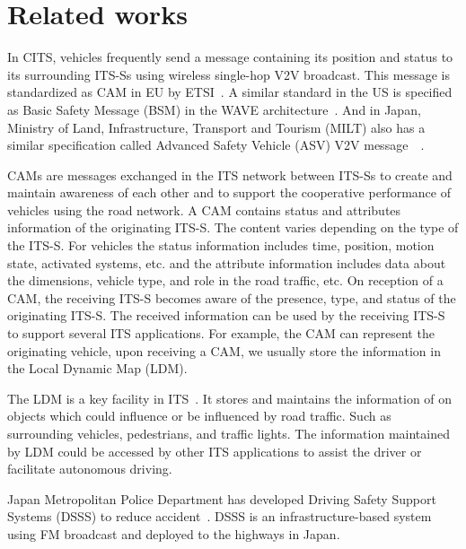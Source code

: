 \section{Related works} \label{sec:related_works}

In CITS, vehicles frequently send a message containing its position
and status to its surrounding ITS-Ss using wireless single-hop V2V broadcast.
This message is standardized as CAM in EU by ETSI~\cite{etsi2014302}.
A similar standard in the US is specified as Basic Safety Message (BSM) in the WAVE architecture~\cite{dsrc2945dsrc}.
And in Japan, Ministry of Land, Infrastructure,
Transport and Tourism (MILT) also has a similar specification called
Advanced Safety Vehicle (ASV) V2V message~\cite{takahashi2000introduction}~\cite{matsumoto1997toyota}.

CAMs are messages exchanged in the ITS network between ITS-Ss to create and maintain awareness of each other
and to support the cooperative performance of vehicles using the road network.
A CAM contains status and attributes information of the originating ITS-S.
The content varies depending on the type of the ITS-S.
For vehicles the status information includes time, position, motion state, activated systems,
etc. and the attribute information includes data about the dimensions,
vehicle type, and role in the road traffic, etc.
On reception of a CAM, the receiving ITS-S becomes aware of the presence, type, and status of the originating ITS-S.
The received information can be used by the receiving ITS-S to support several ITS applications.
For example, the CAM can represent the originating vehicle, upon receiving a CAM,
we usually store the information in the Local Dynamic Map (LDM).

The LDM is a key facility in ITS~\cite{etsi2014302895}.
It stores and maintains the information of on objects which could influence or be influenced by road traffic.
Such as surrounding vehicles, pedestrians, and traffic lights.
The information maintained by LDM could be accessed by other ITS applications to assist the driver or facilitate autonomous driving.

Japan Metropolitan Police Department has developed Driving Safety Support Systems (DSSS) to reduce accident~\cite{yamamoto2006aichi}.
DSSS is an infrastructure-based system using FM broadcast and deployed to the highways in Japan.

